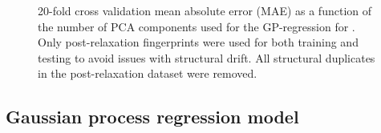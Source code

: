 

\begin{figure}[!htb]
\centering
{}
\caption{\label{fig:cv_anal}
%
20-fold cross validation mean absolute error (MAE) as a function of the number of PCA components used for the GP-regression for \IrOthree.
%
Only post-relaxation fingerprints were used for both training and testing to avoid issues with structural drift.
%
All structural duplicates in the post-relaxation dataset were removed.
}
\end{figure}


\subsection{Gaussian process regression model}  %
%


